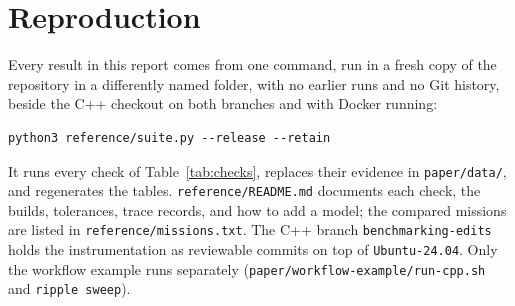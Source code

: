 \documentclass[conference]{IEEEtran}
\begin{document}
\section{Reproduction}
\label{app:reproduction}

Every result in this report comes from one command, run in a fresh copy of the
repository in a differently named folder, with no earlier runs and no Git
history, beside the C++ checkout on both branches and with Docker running:
\begin{verbatim}
python3 reference/suite.py --release --retain
\end{verbatim}
It runs every check of Table~\ref{tab:checks}, replaces their evidence in
\texttt{paper/data/}, and regenerates the tables. \texttt{reference/README.md}
documents each check, the builds, tolerances, trace records, and how to add a
model; the compared missions are listed in \texttt{reference/missions.txt}.
The C++ branch \texttt{benchmarking-edits} holds the instrumentation as
reviewable commits on top of \texttt{Ubuntu-24.04}. Only the workflow example
runs separately (\texttt{paper/workflow-example/run-cpp.sh} and \texttt{ripple sweep}).



\end{document}
